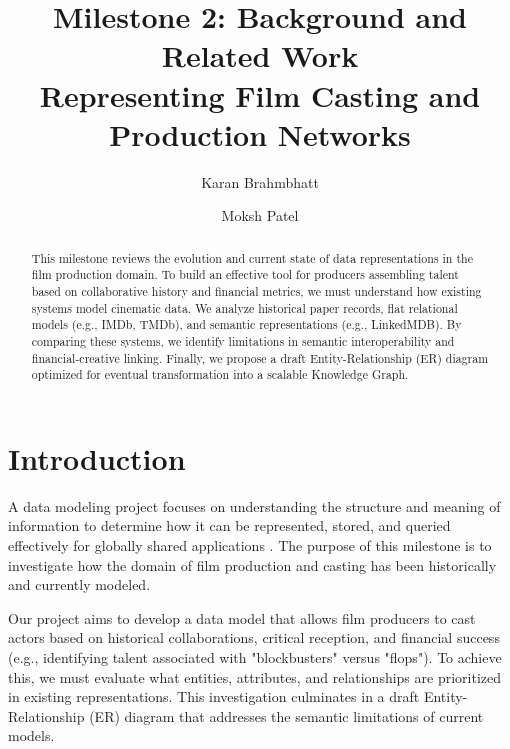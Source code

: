 \documentclass[sigconf]{acmart}
\begin{document}
\title{Milestone 2: Background and Related Work \\ Representing Film Casting and Production Networks}

\author{Karan Brahmbhatt}

\author{Moksh Patel}

\begin{abstract}
This milestone reviews the evolution and current state of data representations in the film production domain. To build an effective tool for producers assembling talent based on collaborative history and financial metrics, we must understand how existing systems model cinematic data. We analyze historical paper records, flat relational models (e.g., IMDb, TMDb), and semantic representations (e.g., LinkedMDB). By comparing these systems, we identify limitations in semantic interoperability and financial-creative linking. Finally, we propose a draft Entity-Relationship (ER) diagram optimized for eventual transformation into a scalable Knowledge Graph.
\end{abstract}

\maketitle

\section{Introduction}
A data modeling project focuses on understanding the structure and meaning of information to determine how it can be represented, stored, and queried effectively for globally shared applications \cite{course}. The purpose of this milestone is to investigate how the domain of film production and casting has been historically and currently modeled. 

Our project aims to develop a data model that allows film producers to cast actors based on historical collaborations, critical reception, and financial success (e.g., identifying talent associated with "blockbusters" versus "flops"). To achieve this, we must evaluate what entities, attributes, and relationships are prioritized in existing representations. This investigation culminates in a draft Entity-Relationship (ER) diagram that addresses the semantic limitations of current models.
\end{document}
